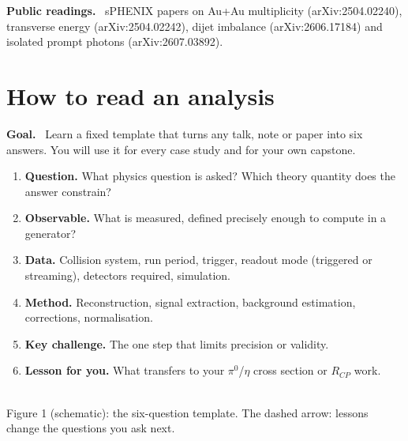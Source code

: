 \documentclass[11pt,letterpaper]{article}
\newcommand{\hd}[1]{\par\smallskip\noindent\textbf{\color{blue!50!black}#1.}\ }
\begin{document}
\hd{Public readings} sPHENIX papers on Au+Au multiplicity (arXiv:2504.02240), transverse energy (arXiv:2504.02242), dijet imbalance
(arXiv:2606.17184) and isolated prompt photons (arXiv:2607.03892).

\section{How to read an analysis}
\hd{Goal} Learn a fixed template that turns any talk, note or paper into six answers. You will use it for every case study and for your
own capstone.

\begin{enumerate}
\item \textbf{Question.} What physics question is asked? Which theory quantity does the answer constrain?
\item \textbf{Observable.} What is measured, defined precisely enough to compute in a generator?
\item \textbf{Data.} Collision system, run period, trigger, readout mode (triggered or streaming), detectors required, simulation.
\item \textbf{Method.} Reconstruction, signal extraction, background estimation, corrections, normalisation.
\item \textbf{Key challenge.} The one step that limits precision or validity.
\item \textbf{Lesson for you.} What transfers to your $\pi^0$/$\eta$ cross section or $R_{CP}$ work.
\end{enumerate}

\begin{center}
\\[2pt]
{\small Figure 1 (schematic): the six-question template. The dashed arrow: lessons change the questions you ask next.}
\end{center}
\end{document}
